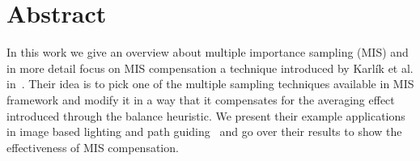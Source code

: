 \chapter{Abstract}
\label{ch:abstract}
In this work we give an overview about multiple importance sampling (MIS)
and in more detail focus on MIS compensation a technique introduced by Karl\'ik et al. in~\cite{Karlik2019}.
Their idea is to pick one of the multiple sampling techniques available in MIS framework
and modify it in a way that it compensates for the averaging effect introduced through the balance heuristic.
We present their example applications in image based lighting
and path guiding~\cite{mueller2017} and go over their results to show the effectiveness of MIS compensation.








